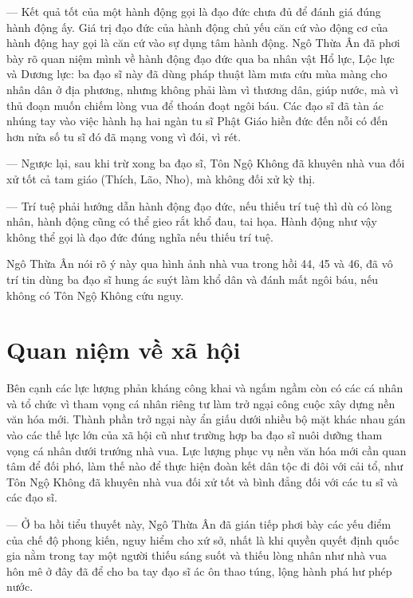 — Kết quả tốt của một hành động gọi là đạo đức chưa đủ để đánh giá đúng hành động ấy. Giá trị đạo đức của hành động chủ yếu căn cứ vào động cơ của hành động hay gọi là căn cứ vào sự dụng tâm hành động. Ngô Thừa Ân đã phơi bày rõ quan niệm mình về hành động đạo đức qua ba nhân vật Hổ lực, Lộc lực và Dương lực: ba đạo sĩ này đã dùng pháp thuật làm mưa cứu mùa màng cho nhân dân ở địa phương, nhưng không phải làm vì thương dân, giúp nước, mà vì thủ đoạn muốn chiếm lòng vua để thoán đoạt ngôi báu. Các đạo sĩ đã tàn ác nhúng tay vào việc hành hạ hai ngàn tu sĩ Phật Giáo hiền đức đến nỗi có đến hơn nửa số tu sĩ đó đã mạng vong vì đói, vì rét.

— Ngược lại, sau khi trừ xong ba đạo sĩ, Tôn Ngộ Không đã khuyên nhà vua đối xử tốt cả tam giáo (Thích, Lão, Nho), mà không đối xử kỳ thị.

— Trí tuệ phải hướng dẫn hành động đạo đức, nếu thiếu trí tuệ thì dù có lòng nhân, hành động cũng có thể gieo rắt khổ đau, tai họa. Hành động như vậy không thể gọi là đạo đức đúng nghĩa nếu thiếu trí tuệ.

Ngô Thừa Ân nói rõ ý này qua hình ảnh nhà vua trong hồi 44, 45 và 46, đã vô trí tin dùng ba đạo sĩ hung ác suýt làm khổ dân và đánh mất ngôi báu, nếu không có Tôn Ngộ Không cứu nguy.


\section{Quan niệm về xã hội} %
\label{sec:44_45_xa_hoi}

Bên cạnh các lực lượng phản kháng công khai và ngấm ngầm còn có các cá nhân và tổ chức vì tham vọng cá nhân riêng tư làm trở ngại công cuộc xây dựng nền văn hóa mới. Thành phần trở ngại này ẩn giấu dưới nhiều bộ mặt khác nhau gán vào các thế lực lớn của xã hội cũ như trường hợp ba đạo sĩ nuôi dưỡng tham vọng cá nhân dưới trướng nhà vua. Lực lượng phục vụ nền văn hóa mới cần quan tâm để đối phó, làm thế nào để thực hiện đoàn kết dân tộc đi đôi với cải tổ, như Tôn Ngộ Không đã khuyên nhà vua đối xử tốt và bình đẳng đối với các tu sĩ và các đạo sĩ.

— Ở ba hồi tiểu thuyết này, Ngô Thừa Ân đã gián tiếp phơi bày các yếu điểm của chế độ phong kiến, nguy hiểm cho xứ sở, nhất là khi quyền quyết định quốc gia nằm trong tay một người thiếu sáng suốt và thiếu lòng nhân như nhà vua hôn mê ở đây đã để cho ba tay đạo sĩ ác ôn thao túng, lộng hành phá hư phép nước.
